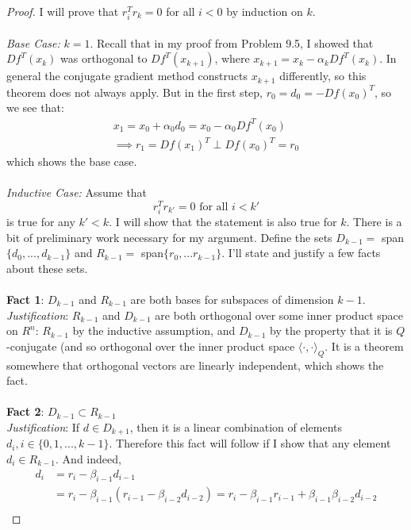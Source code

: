 \documentclass[12pt]{article}
\newenvironment{problem}[2][Problem]{\begin{trivlist}
\item[\hskip \labelsep {\bfseries #1}\hskip \labelsep {\bfseries #2.}]}{\end{trivlist}}
\theoremstyle{definition}
\theoremstyle{definition}
\theoremstyle{definition}
\theoremstyle{definition}
\begin{document}
\begin{problem}{9.20}
\begin{proof}
I will prove that $r_i^T r_k = 0$ for all $i < 0$ by induction on $k$. \\
\\
\textit{Base Case:} $k = 1$. Recall that in my proof from Problem 9.5, I showed that $Df^T(x_k)$ was orthogonal to $Df^T(x_{k+1})$, where $x_{k+1} = x_k - \alpha_k Df^T(x_k)$. In general the conjugate gradient method constructs $x_{k+1}$ differently, so this theorem does not always apply. But in the first step, $r_0 = d_0 = -Df(x_0)^T$, so we see that:
\begin{align*}
x_1 = x_0 + \alpha_0 d_0 = x_0 - \alpha_0 Df^T(x_0) \\
\implies r_1 = Df(x_1)^T \perp Df(x_0)^T = r_0 
\end{align*}
which shows the base case. \\
\\
\textit{Inductive Case:} Assume that 
$$r_i^T r_{k'} = 0 \text{ for all } i < k'$$ is true for any $k' < k$. I will show that the statement is also true for $k$. There is a bit of preliminary work necessary for my argument. Define the sets $D_{k-1} = $ span$\{d_0,...,d_{k-1}\}$ and $R_{k-1} = $ span$\{r_0, ... r_{k-1}\}$. I'll state and justify a few facts about these sets. \\
\\
\textbf{Fact 1}: $D_{k-1}$ and $R_{k-1}$ are both bases for subspaces of dimension $k-1$.\\
\textit{Justification}: $R_{k-1}$ and $D_{k-1}$ are both orthogonal over some inner product space on $R^{n}$: $R_{k-1}$ by the inductive assumption, and $D_{k-1}$ by the property that it is $Q$-conjugate (and so orthogonal over the inner product space $\langle \cdot, \cdot \rangle_Q$. It is a theorem somewhere that orthogonal vectors are linearly independent, which shows the fact. \\
\\
\textbf{Fact 2}: $D_{k-1} \subset R_{k-1}$ \\
\textit{Justification}: If $d \in D_{k+1}$, then it is a linear combination of elements $d_i, i \in \{0, 1, ..., k-1\}$. Therefore this fact will follow if I show that any element $d_i \in R_{k-1}$. And indeed, 
\begin{align*}
d_i &= r_{i} - \beta_{i-1}d_{i-1} \\
&= r_i - \beta_{i-1}(r_{i-1} - \beta_{i-2}d_{i-2}) = r_i - \beta_{i-1} r_{i-1} + \beta_{i-1} \beta_{i-2} d_{i-2} \\

\end{align*}
\end{proof}
\end{problem}
\end{document}
